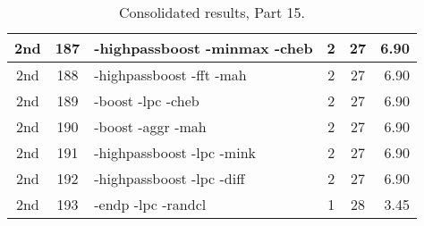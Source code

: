 \begin{table}
\begin{minipage}[b]{\textwidth}
\begin{tabular}{|c|c|l|c|c|r|}
2nd & 187 & -highpassboost -minmax -cheb  & 2 & 27 & 6.90\\ \hline
2nd & 188 & -highpassboost -fft -mah  & 2 & 27 & 6.90\\ \hline
2nd & 189 & -boost -lpc -cheb  & 2 & 27 & 6.90\\ \hline
2nd & 190 & -boost -aggr -mah  & 2 & 27 & 6.90\\ \hline
2nd & 191 & -highpassboost -lpc -mink  & 2 & 27 & 6.90\\ \hline
2nd & 192 & -highpassboost -lpc -diff  & 2 & 27 & 6.90\\ \hline
2nd & 193 & -endp -lpc -randcl  & 1 & 28 & 3.45\\ \hline
\end{tabular}
\end{minipage}
\caption{Consolidated results, Part 15.}
\label{tab:results15}
\end{table}

